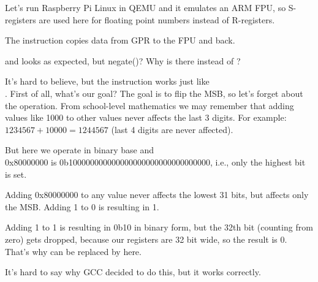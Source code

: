 


Let's run Raspberry Pi Linux in QEMU and it emulates an ARM FPU, so S-registers are used here for floating point
numbers instead of R-registers.


The \FMRS instruction copies data from \ac{GPR} to the FPU and back.

 and  looks as expected, but negate()?
Why is there \ADD instead of \XOR?

It's hard to believe, but the instruction 
 works just like \\
.
First of all, what's our goal?
The goal is to flip the \ac{MSB}, so let's forget about the \XOR operation.
From school-level mathematics we may remember that adding values like 1000 to other values never affects
the last 3 digits.
For example: $1234567 + 10000 = 1244567$ (last 4 digits are never affected).

But here we operate in binary base and\\
0x80000000 is 0b100000000000000000000000000000000, i.e., only the highest bit is set.

Adding 0x80000000 to any value never affects the lowest 31 bits, but affects only the \ac{MSB}.
Adding 1 to 0 is resulting in 1.

Adding 1 to 1 is resulting in 0b10 in binary form, but the 32th bit (counting from zero) gets dropped, 
because our registers are 32 bit wide, so the result is 0.
That's why \XOR can be replaced by \ADD here.

It's hard to say why GCC decided to do this, but it works correctly.
